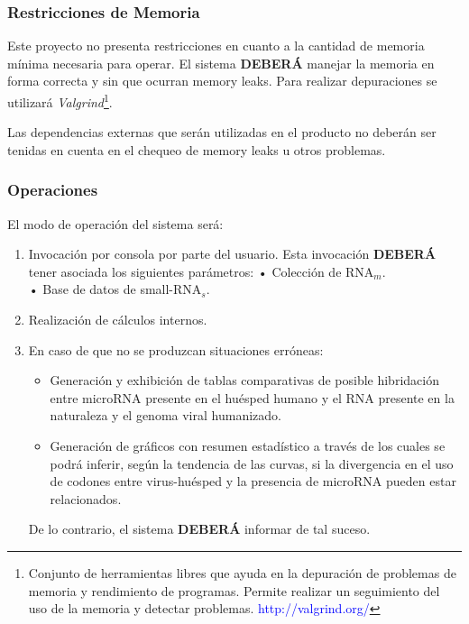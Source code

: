 \documentclass[12pt,a4paper,spanish]{article}
\begin{document}
	\subsubsection{Restricciones de Memoria}	
		\par Este proyecto no presenta restricciones en cuanto a la cantidad de memoria mínima necesaria para operar. El sistema \textbf{DEBERÁ} manejar 			la memoria en forma correcta y sin que ocurran memory leaks. Para realizar depuraciones se utilizará \textit{Valgrind}\footnote{Conjunto de 		herramientas libres que ayuda en la depuración de problemas de memoria y rendimiento de programas. Permite realizar un seguimiento del uso de la 			memoria y detectar problemas. \textcolor{blue}{http://valgrind.org/}}.
		\par Las dependencias externas que serán utilizadas en el producto no deberán ser tenidas en cuenta en el chequeo 
		de memory leaks u otros problemas.
		
	\subsubsection{Operaciones}
		El modo de operación del sistema será: 
		\begin{enumerate}
			\item Invocación por consola por parte del usuario. Esta invocación \textbf{DEBERÁ} tener asociada los siguientes parámetros: 
					\vskip 0.25cm
					\hspace*{0.75cm} • Colección de RNA$_m$. \\
					\hspace*{0.75cm} • Base de datos de small-RNA$_s$. 
			\item Realización de cálculos internos.
			\item En caso de que no se produzcan situaciones erróneas: 
				\begin{itemize}
					\item Generación y exhibición de tablas comparativas de posible hibridación entre microRNA presente en 						el huésped humano y el RNA presente en la naturaleza y el genoma viral humanizado. 
					\item Generación de gráficos con resumen estadístico a través de los cuales se podrá inferir, según la 						tendencia de las curvas, si la divergencia en el uso de codones entre virus-huésped y la presencia de 						microRNA pueden estar relacionados.
				\end{itemize}
				De lo contrario, el sistema \textbf{DEBERÁ} informar de tal suceso.
		\end{enumerate}
\end{document}
